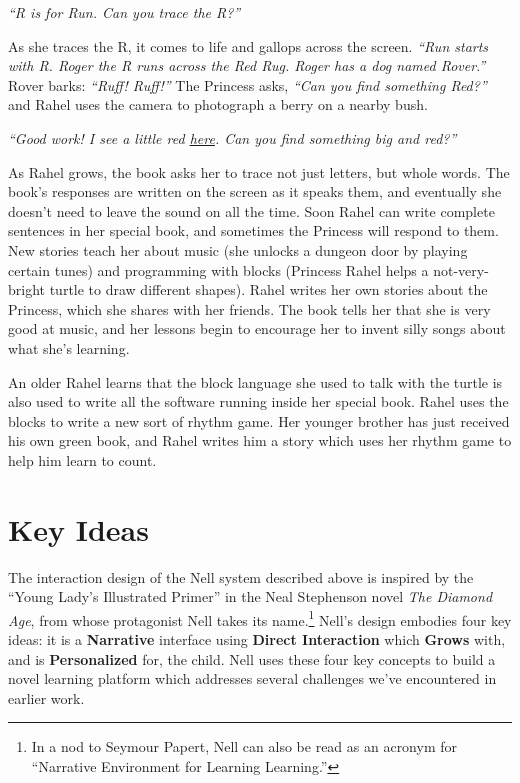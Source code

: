\documentclass{sig-alternate}
\begin{document}
\textit{``R is for Run.  Can you trace the R?''}

As she traces the R, it comes to life and gallops across the screen.
\textit{``Run starts with R.  Roger the R runs across the Red Rug.
Roger has a dog named Rover.''}  Rover barks: \textit{``Ruff! Ruff!''}  The
Princess asks, \textit{``Can you find something Red?''} and Rahel uses the
camera to photograph a berry on a nearby bush.

\emph{``Good work!  I see a little red \underline{here}.  Can you find
something \emph{big} and red?''}

As Rahel grows, the book asks her to trace not just letters, but whole
words.  The book's responses are written on the screen as it speaks
them, and eventually she doesn't need to leave the sound on all the
time.  Soon Rahel can write complete sentences in her special book,
and sometimes the Princess will respond to them.  New stories teach her about
music (she unlocks a dungeon door by playing certain tunes) and
programming with blocks (Princess Rahel helps a not-very-bright turtle
to draw different shapes).  Rahel writes her own stories about the Princess,
which she shares with her friends.  The book tells her that she is
very good at music, and her lessons begin to encourage her to invent
silly songs about what she's learning.

An older Rahel learns that the block language she used to talk with
the turtle is also used to write all the software running inside
her special book.  Rahel uses the blocks to write a new sort of rhythm
game.  Her younger brother has just received his own green book,
and Rahel writes him a story which uses her rhythm game to help him learn
to count.

\section{Key Ideas}
The interaction design of the Nell system described above is inspired
by the ``Young Lady's Illustrated Primer'' in the Neal Stephenson
novel \textit{The Diamond Age}, from whose protagonist Nell takes its
name.\footnote{In a nod to Seymour Papert, Nell can also be read as an
acronym for ``Narrative Environment for Learning Learning.''}
Nell's design embodies four key ideas: it is a \textbf{Narrative}
interface using \textbf{Direct Interaction} which \textbf{Grows} with,
and is \textbf{Personalized} for, the child.
Nell uses these four key concepts to build a novel learning platform
which addresses several challenges we've encountered in earlier work.
\end{document}
